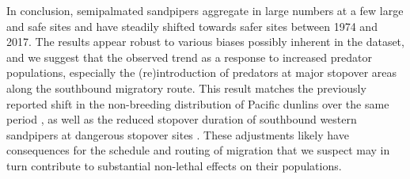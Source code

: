 

In conclusion, semipalmated sandpipers aggregate in large numbers at a few large and safe sites and have steadily shifted towards safer sites between 1974 and 2017. The results appear robust to various biases possibly inherent in the dataset, and we suggest that the observed trend as a response to increased predator populations, especially the (re)introduction of predators at major stopover areas along the southbound migratory route. This result matches the previously reported shift in the non-breeding distribution of Pacific dunlins over the same period \citep{Ydenberg2017}, as well as the reduced stopover duration of southbound western sandpipers at dangerous stopover sites \citep{ydenberg_western_2004}. These adjustments likely have consequences for the schedule and
routing of migration that we suspect may in turn contribute to substantial non-lethal effects on their populations.  